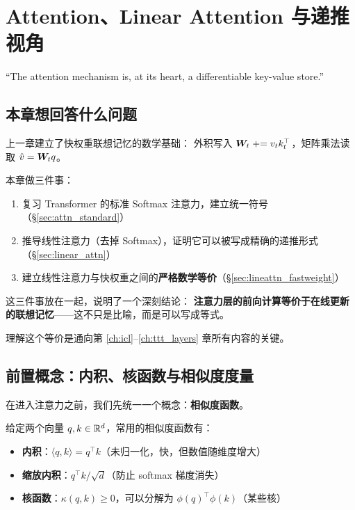 \chapter{Attention、Linear Attention 与递推视角}
\label{ch:attention}

\epigraph{``The attention mechanism is, at its heart, a differentiable key-value store.''}{}

\section{本章想回答什么问题}

上一章建立了快权重联想记忆的数学基础：
外积写入 $\boldsymbol{W}_t \mathrel{+}= v_t k_t^\top$，矩阵乘法读取 $\hat{v} = \boldsymbol{W}_t q$。

本章做三件事：
\begin{enumerate}
  \item 复习 Transformer 的标准 Softmax 注意力，建立统一符号（\S\ref{sec:attn_standard}）
  \item 推导线性注意力（去掉 Softmax），证明它可以被写成精确的递推形式（\S\ref{sec:linear_attn}）
  \item 建立线性注意力与快权重之间的\textbf{严格数学等价}（\S\ref{sec:lineattn_fastweight}）
\end{enumerate}

这三件事放在一起，说明了一个深刻结论：
\textbf{注意力层的前向计算等价于在线更新的联想记忆}——这不只是比喻，而是可以写成等式。

理解这个等价是通向第 \ref{ch:icl}--\ref{ch:ttt_layers} 章所有内容的关键。

\section{前置概念：内积、核函数与相似度度量}
\label{sec:attn_prelim}

在进入注意力之前，我们先统一一个概念：\textbf{相似度函数}。

给定两个向量 $q, k \in \mathbb{R}^d$，常用的相似度函数有：
\begin{itemize}
  \item \textbf{内积}：$\langle q, k \rangle = q^\top k$（未归一化，快，但数值随维度增大）
  \item \textbf{缩放内积}：$q^\top k / \sqrt{d}$（防止 softmax 梯度消失）
  \item \textbf{核函数}：$\kappa(q, k) \ge 0$，可以分解为 $\phi(q)^\top \phi(k)$（某些核）
\end{itemize}

